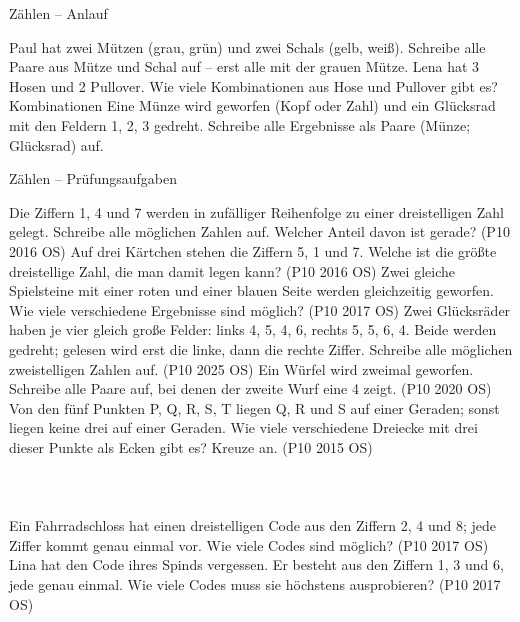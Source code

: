 \setcounter{aufgabe}{16}

\begin{aufgabe}{Zählen – Anlauf}
\begin{teile}
\teil Paul hat zwei Mützen (grau, grün) und zwei Schals (gelb, weiß). Schreibe alle Paare aus Mütze und Schal auf – erst alle mit der grauen Mütze.
\teil Lena hat 3 Hosen und 2 Pullover. Wie viele Kombinationen aus Hose und Pullover gibt es? \leerfeld Kombinationen
\teil Eine Münze wird geworfen (Kopf oder Zahl) und ein Glücksrad mit den Feldern 1, 2, 3 gedreht. Schreibe alle Ergebnisse als Paare (Münze; Glücksrad) auf.
\end{teile}
\end{aufgabe}

\begin{aufgabe}{Zählen – Prüfungsaufgaben}
\begin{teile}
\teil Die Ziffern 1, 4 und 7 werden in zufälliger Reihenfolge zu einer dreistelligen Zahl gelegt. Schreibe alle möglichen Zahlen auf. Welcher Anteil davon ist gerade? \hfill (P10 2016 OS)
\teil Auf drei Kärtchen stehen die Ziffern 5, 1 und 7. Welche ist die größte dreistellige Zahl, die man damit legen kann? \hfill (P10 2016 OS)
\teil Zwei gleiche Spielsteine mit einer roten und einer blauen Seite werden gleichzeitig geworfen. Wie viele verschiedene Ergebnisse sind möglich? \hfill (P10 2017 OS)
\teil Zwei Glücksräder haben je vier gleich große Felder: links 4, 5, 4, 6, rechts 5, 5, 6, 4. Beide werden gedreht; gelesen wird erst die linke, dann die rechte Ziffer. Schreibe alle möglichen zweistelligen Zahlen auf. \hfill (P10 2025 OS)
\teil Ein Würfel wird zweimal geworfen. Schreibe alle Paare auf, bei denen der zweite Wurf eine 4 zeigt. \hfill (P10 2020 OS)
\teil Von den fünf Punkten P, Q, R, S, T liegen Q, R und S auf einer Geraden; sonst liegen keine drei auf einer Geraden. Wie viele verschiedene Dreiecke mit drei dieser Punkte als Ecken gibt es? Kreuze an. \hfill (P10 2015 OS) \\  \\  \\  \\ 
\steil Ein Fahrradschloss hat einen dreistelligen Code aus den Ziffern 2, 4 und 8; jede Ziffer kommt genau einmal vor. Wie viele Codes sind möglich? \hfill (P10 2017 OS)
\steil Lina hat den Code ihres Spinds vergessen. Er besteht aus den Ziffern 1, 3 und 6, jede genau einmal. Wie viele Codes muss sie höchstens ausprobieren? \hfill (P10 2017 OS)
\end{teile}
\end{aufgabe}


